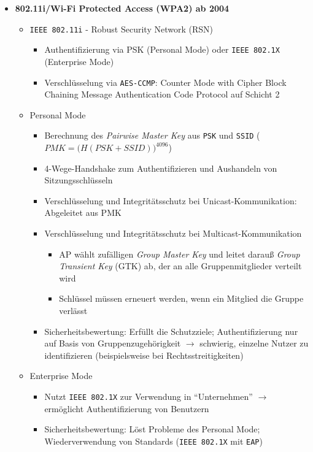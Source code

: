 \begin{itemize}
\begin{itemize}
	\end{itemize}
	\item \textbf{802.11i/Wi-Fi Protected Access (WPA2) ab 2004}
	\begin{itemize}
		\item \texttt{IEEE 802.11i} - Robust Security Network (RSN)
		\begin{itemize}
			\item Authentifizierung via PSK (Personal Mode) oder \texttt{IEEE 802.1X} (Enterprise Mode)
			\item Verschlüsselung via \texttt{AES-CCMP}: Counter Mode with Cipher Block Chaining Message Authentication Code Protocol auf Schicht 2
		\end{itemize}
		\item Personal Mode
		\begin{itemize}
			\item Berechnung des \textit{Pairwise Master Key} aus \texttt{PSK} und \texttt{SSID} (\(PMK = \big(H(PSK+SSID)\big)^{4096}\))
			\item 4-Wege-Handshake zum Authentifizieren und Aushandeln von Sitzungsschlüsseln
			\item Verschlüsselung und Integritätsschutz bei Unicast-Kommunikation: Abgeleitet aus PMK
			\item Verschlüsselung und Integritätsschutz bei Multicast-Kommunikation
			\begin{itemize}
				\item AP wählt zufälligen \textit{Group Master Key} und leitet darauß \textit{Group Transient Key} (GTK) ab, der an alle Gruppenmitglieder verteilt wird
				\item Schlüssel müssen erneuert werden, wenn ein Mitglied die Gruppe verlässt
			\end{itemize}
			\item Sicherheitsbewertung: Erfüllt die Schutzziele; Authentifizierung nur auf Basis von Gruppenzugehörigkeit \(\rightarrow\) schwierig, einzelne Nutzer zu identifizieren (beispielsweise bei Rechtsstreitigkeiten)
		\end{itemize}
		\item Enterprise Mode
		\begin{itemize}
			\item Nutzt \texttt{IEEE 802.1X} zur Verwendung in "`Unternehmen"' \(\rightarrow\) ermöglicht Authentifizierung von Benutzern
			\item Sicherheitsbewertung: Löst Probleme des Personal Mode; Wiederverwendung von Standards (\texttt{IEEE 802.1X} mit \texttt{EAP})
		\end{itemize}
	\end{itemize}
\end{itemize}


